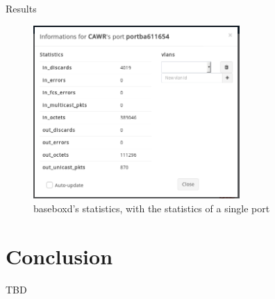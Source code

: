 \documentclass{beamer}
\begin{document}
\begin{frame}{Results}
    \begin{figure}[!tbph]
      \centering
      \includegraphics[width=0.7\textwidth]{bisdn/basebox_gui}
      \caption {baseboxd's statistics, with the statistics of a single port}
    \end{figure}
\end{frame}
\section{Conclusion}

\begin{frame}{}
    TBD
\end{frame}
\end{document}
